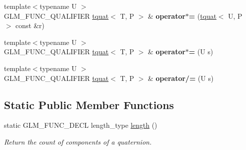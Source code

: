 \begin{DoxyCompactItemize}
\item 
\mbox{\label{structglm_1_1tquat_a98b7195afd81e7fbf097208c75602240}} 
{\footnotesize template$<$typename U $>$ }\\G\+L\+M\+\_\+\+F\+U\+N\+C\+\_\+\+Q\+U\+A\+L\+I\+F\+I\+ER \hyperlink{structglm_1_1tquat}{tquat}$<$ T, P $>$ \& {\bfseries operator$\ast$=} (\hyperlink{structglm_1_1tquat}{tquat}$<$ U, P $>$ const \&r)
\item 
\mbox{\label{structglm_1_1tquat_aa6217e9a0b83ec0cabdd32dce73d8d05}} 
{\footnotesize template$<$typename U $>$ }\\G\+L\+M\+\_\+\+F\+U\+N\+C\+\_\+\+Q\+U\+A\+L\+I\+F\+I\+ER \hyperlink{structglm_1_1tquat}{tquat}$<$ T, P $>$ \& {\bfseries operator$\ast$=} (U s)
\item 
\mbox{\label{structglm_1_1tquat_a320e96991b6611e14172310e42f72d5f}} 
{\footnotesize template$<$typename U $>$ }\\G\+L\+M\+\_\+\+F\+U\+N\+C\+\_\+\+Q\+U\+A\+L\+I\+F\+I\+ER \hyperlink{structglm_1_1tquat}{tquat}$<$ T, P $>$ \& {\bfseries operator/=} (U s)
\end{DoxyCompactItemize}
\subsection*{Static Public Member Functions}
\begin{DoxyCompactItemize}
\item 
\mbox{\label{structglm_1_1tquat_a0580a3d29f748f91ae9f1410e589b925}} 
static G\+L\+M\+\_\+\+F\+U\+N\+C\+\_\+\+D\+E\+CL length\+\_\+type \hyperlink{structglm_1_1tquat_a0580a3d29f748f91ae9f1410e589b925}{length} ()
\begin{DoxyCompactList}\small\item\em Return the count of components of a quaternion. \end{DoxyCompactList}\end{DoxyCompactItemize}
